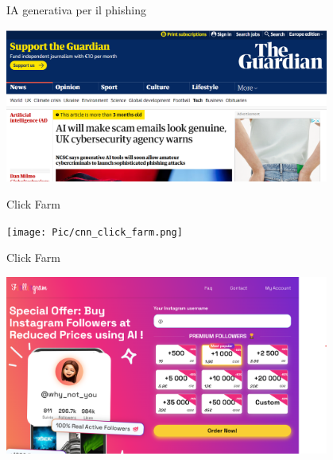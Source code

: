 \documentclass[11pt]{beamer}
\begin{document}
\begin{frame}{IA generativa per il phishing \cite{genia_gur}}

\begin{center}
\includegraphics[width=0.8\textwidth]{Pic/AI_phishing.png}
\end{center}

\end{frame}

\begin{frame}{Click Farm \cite{clickfarm}}

\begin{center}
\texttt{[image: Pic/cnn\_click\_farm.png]}
\end{center}

\end{frame}



\begin{frame}{Click Farm }

\begin{center}
\includegraphics[width=0.8\textwidth]{Pic/compra_account_instagram.png}
\end{center}

\end{frame}
\end{document}
